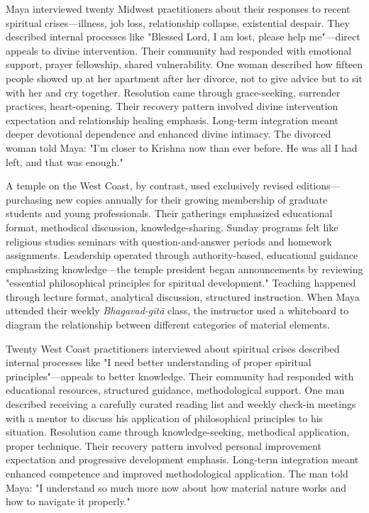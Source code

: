 \documentclass[12pt,twoside]{book}
\begin{document}
Maya interviewed twenty Midwest practitioners about their responses to recent spiritual crises—illness, job loss, relationship collapse, existential despair. They described internal processes like "Blessed Lord, I am lost, please help me"—direct appeals to divine intervention. Their community had responded with emotional support, prayer fellowship, shared vulnerability. One woman described how fifteen people showed up at her apartment after her divorce, not to give advice but to sit with her and cry together. Resolution came through grace-seeking, surrender practices, heart-opening. Their recovery pattern involved divine intervention expectation and relationship healing emphasis. Long-term integration meant deeper devotional dependence and enhanced divine intimacy. The divorced woman told Maya: "I'm closer to Krishna now than ever before. He was all I had left, and that was enough."

A temple on the West Coast, by contrast, used exclusively revised editions—purchasing new copies annually for their growing membership of graduate students and young professionals. Their gatherings emphasized educational format, methodical discussion, knowledge-sharing. Sunday programs felt like religious studies seminars with question-and-answer periods and homework assignments. Leadership operated through authority-based, educational guidance emphasizing knowledge—the temple president began announcements by reviewing "essential philosophical principles for spiritual development." Teaching happened through lecture format, analytical discussion, structured instruction. When Maya attended their weekly \emph{Bhagavad-gītā} class, the instructor used a whiteboard to diagram the relationship between different categories of material elements.

Twenty West Coast practitioners interviewed about spiritual crises described internal processes like "I need better understanding of proper spiritual principles"—appeals to better knowledge. Their community had responded with educational resources, structured guidance, methodological support. One man described receiving a carefully curated reading list and weekly check-in meetings with a mentor to discuss his application of philosophical principles to his situation. Resolution came through knowledge-seeking, methodical application, proper technique. Their recovery pattern involved personal improvement expectation and progressive development emphasis. Long-term integration meant enhanced competence and improved methodological application. The man told Maya: "I understand so much more now about how material nature works and how to navigate it properly."
\end{document}
